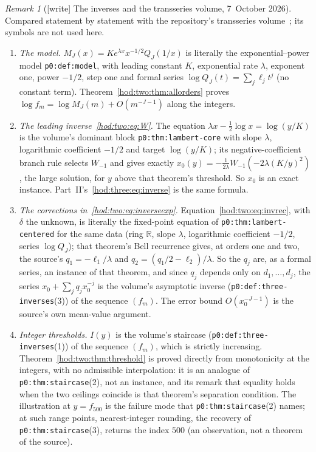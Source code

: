 \documentclass[11pt,letterpaper]{article}
\theoremstyle{definition}\newtheorem{definition}[theorem]{Definition}
\theoremstyle{remark}\newtheorem{remark}[theorem]{Remark}
\newcommand{\file}[1]{\nolinkurl{#1}}
\begin{document}
\begin{remark}[{[write]} The inverses and the transseries volume, 7~October 2026]\label{hod:two:rem:transseries}
Compared statement by statement with the repository's transseries
volume~\cite{TSvol}; its symbols are not used here.
\begin{enumerate}\raggedright
\item \emph{The model.} $M_J(x)=Ke^{\lambda x}x^{-1/2}Q_J(1/x)$ is literally the exponential--power model \file{p0:def:model}, with leading constant $K$, exponential rate $\lambda$, exponent one, power $-1/2$, step one and formal series $\log Q_J(t)=\sum_j\ell_jt^j$ (no constant term). Theorem~\ref{hod:two:thm:allorders} proves $\log f_m=\log M_J(m)+O(m^{-J-1})$ along the integers.
\item \emph{The leading inverse~\eqref{hod:two:eq:W}.} The equation $\lambda x-\frac12\log x=\log(y/K)$ is the volume's dominant block \file{p0:thm:lambert-core} with slope $\lambda$, logarithmic coefficient $-1/2$ and target $\log(y/K)$; its negative-coefficient branch rule selects $W_{-1}$ and gives exactly $x_0(y)=-\frac1{2\lambda}W_{-1}(-2\lambda(K/y)^2)$, the large solution, for $y$ above that theorem's threshold. So $x_0$ is an exact instance. Part~II's~\eqref{hod:three:eq:inverse} is the same formula.
\item \emph{The corrections in~\eqref{hod:two:eq:inverseexp}.} Equation~\eqref{hod:two:eq:invrec}, with $\delta$ the unknown, is literally the fixed-point equation of \file{p0:thm:lambert-centered} for the same data (ring $\mathbb R$, slope $\lambda$, logarithmic coefficient $-1/2$, series $\log Q_J$); that theorem's Bell recurrence gives, at orders one and two, the source's $q_1=-\ell_1/\lambda$ and $q_2=(q_1/2-\ell_2)/\lambda$. So the $q_j$ are, as a formal series, an instance of that theorem, and since $q_j$ depends only on $d_1,\ldots,d_j$, the series $x_0+\sum_jq_jx_0^{-j}$ is the volume's asymptotic inverse (\file{p0:def:three-inverses}(3)) of the sequence $(f_m)$. The error bound $O(x_0^{-J-1})$ is the source's own mean-value argument.
\item \emph{Integer thresholds.} $I(y)$ is the volume's staircase (\file{p0:def:three-inverses}(1)) of the sequence $(f_m)$, which is strictly increasing. Theorem~\ref{hod:two:thm:threshold} is proved directly from monotonicity at the integers, with no admissible interpolation: it is an analogue of \file{p0:thm:staircase}(2), not an instance, and its remark that equality holds when the two ceilings coincide is that theorem's separation condition. The illustration at $y=f_{500}$ is the failure mode that \file{p0:thm:staircase}(2) names; at such range points, nearest-integer rounding, the recovery of \file{p0:thm:staircase}(3), returns the index $500$ (an observation, not a theorem of the source).
\end{enumerate}
\end{remark}
\end{document}
